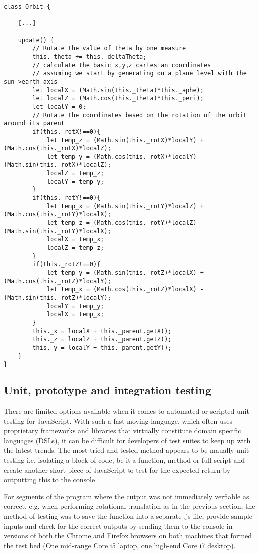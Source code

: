 \documentclass[twoside]{bhamthesis}
\begin{document}
\begin{lstlisting}[label=Implemented code for rotation in 3D space, caption=Implemented code for rotation in 3D space on an update() call, captionpos=b]
class Orbit {

	[...]
	
	update() {
		// Rotate the value of theta by one measure
		this._theta += this._deltaTheta;
		// calculate the basic x,y,z cartesian coordinates
		// assuming we start by generating on a plane level with the sun->earth axis
		let localX = (Math.sin(this._theta)*this._aphe);
		let localZ = (Math.cos(this._theta)*this._peri);
		let localY = 0;
		// Rotate the coordinates based on the rotation of the orbit around its parent
		if(this._rotX!==0){
			let temp_z = (Math.sin(this._rotX)*localY) + (Math.cos(this._rotX)*localZ);
			let temp_y = (Math.cos(this._rotX)*localY) - (Math.sin(this._rotX)*localZ);
			localZ = temp_z;
			localY = temp_y;
		}
		if(this._rotY!==0){
			let temp_x = (Math.sin(this._rotY)*localZ) + (Math.cos(this._rotY)*localX);
			let temp_z = (Math.cos(this._rotY)*localZ) - (Math.sin(this._rotY)*localX);
			localX = temp_x;
			localZ = temp_z;
		}
		if(this._rotZ!==0){
			let temp_y = (Math.sin(this._rotZ)*localX) + (Math.cos(this._rotZ)*localY);
			let temp_x = (Math.cos(this._rotZ)*localX) - (Math.sin(this._rotZ)*localY);
			localY = temp_y;
			localX = temp_x;
		}
		this._x = localX + this._parent.getX();
		this._z = localZ + this._parent.getZ();
		this._y = localY + this._parent.getY();
	}
}
\end{lstlisting}

\newpage


\subsection{Unit, prototype and integration testing}

There are limited options available when it comes to automated or scripted unit testing for JavaScript. With such a fast moving language, which often uses proprietary frameworks and libraries that virtually constitute domain specific languages (DSLs), it can be difficult for developers of test suites to keep up with the latest trends.
The most tried and tested method appears to be maually unit testing i.e. isolating a block of code, be it a function, method or full script and create another short piece of JavaScript to test for the expected return by outputting this to the console \cite{zaefferer_introduction_2012}.

For segments of the program where the output was not immediately verfiable as correct, e.g. when performing rotational translation as in the previous section, the method of testing was to save the function into a separate .js file, provide sample inputs and check for the correct outputs by sending them to the console in versions of both the Chrome and Firefox browsers on both machines that formed the test bed (One mid-range Core i5 laptop, one high-end Core i7 desktop).
\end{document}
